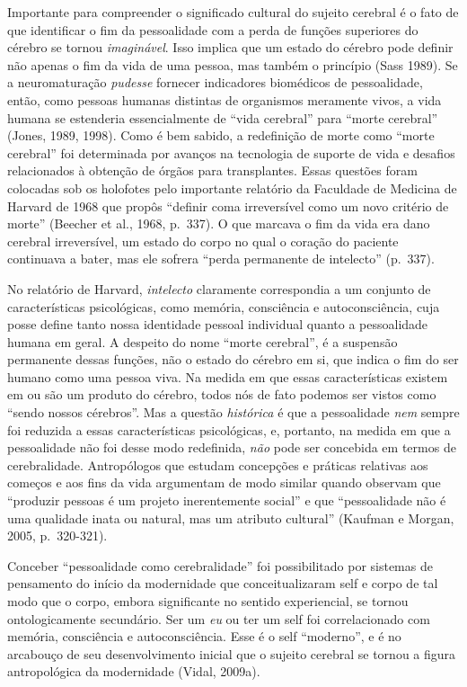 Importante para compreender o significado cultural do sujeito cerebral é
o fato de que identificar o fim da pessoalidade com a perda de funções
superiores do cérebro se tornou \emph{imaginável}. Isso implica que um
estado do cérebro pode definir não apenas o fim da vida de uma pessoa,
mas também o princípio (Sass 1989). Se a neuromaturação \emph{pudesse}
fornecer indicadores biomédicos de pessoalidade, então, como pessoas
humanas distintas de organismos meramente vivos, a vida humana se
estenderia essencialmente de ``vida cerebral'' para ``morte cerebral''
(Jones, 1989, 1998). Como é bem sabido, a redefinição de morte como
``morte cerebral'' foi determinada por avanços na tecnologia de suporte
de vida e desafios relacionados à obtenção de órgãos para transplantes.
Essas questões foram colocadas sob os holofotes pelo importante
relatório da Faculdade de Medicina de Harvard de 1968 que propôs
``definir coma irreversível como um novo critério de morte'' (Beecher et
al., 1968, p.~337). O que marcava o fim da vida era dano cerebral
irreversível, um estado do corpo no qual o coração do paciente
continuava a bater, mas ele sofrera ``perda permanente de intelecto''
(p.~337).

No relatório de Harvard, \emph{intelecto} claramente correspondia a um
conjunto de características psicológicas, como memória, consciência e
autoconsciência, cuja posse define tanto nossa identidade pessoal
individual quanto a pessoalidade humana em geral. A despeito do nome
``morte cerebral'', é a suspensão permanente dessas funções, não o
estado do cérebro em si, que indica o fim do ser humano como uma pessoa
viva. Na medida em que essas características existem em ou são um
produto do cérebro, todos nós de fato podemos ser vistos como ``sendo
nossos cérebros''. Mas a questão \emph{histórica} é que a pessoalidade
\emph{nem} sempre foi reduzida a essas características psicológicas, e,
portanto, na medida em que a pessoalidade não foi desse modo redefinida,
\emph{não} pode ser concebida em termos de cerebralidade. Antropólogos
que estudam concepções e práticas relativas aos começos e aos fins da
vida argumentam de modo similar quando observam que ``produzir pessoas é
um projeto inerentemente social'' e que ``pessoalidade não é uma
qualidade inata ou natural, mas um atributo cultural'' (Kaufman e
Morgan, 2005, p.~320-321).

Conceber ``pessoalidade como cerebralidade'' foi possibilitado por
sistemas de pensamento do início da modernidade que conceitualizaram
self e corpo de tal modo que o corpo, embora significante no sentido
experiencial, se tornou ontologicamente secundário. Ser um \emph{eu} ou
ter um self foi correlacionado com memória, consciência e
autoconsciência. Esse é o self ``moderno'', e é no arcabouço de seu
desenvolvimento inicial que o sujeito cerebral se tornou a figura
antropológica da modernidade (Vidal, 2009a).

